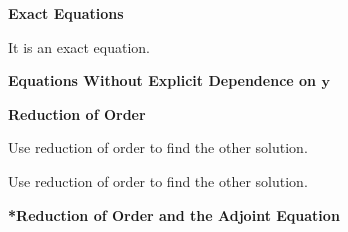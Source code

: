 {%
\begin{Hint}
  \label{hint x2y-2xy+2y=0}
\end{Hint}







\begin{large}
  \noindent
  \textbf{Exact Equations}
\end{large}



\begin{Hint}
  \label{hint y+ysinx+ycosx}
  It is an exact equation.
\end{Hint}



\begin{large}
  \noindent
  \textbf{Equations Without Explicit Dependence on $\mathbf{y}$}
\end{large}

\begin{large}
  \noindent
  \textbf{Reduction of Order}
\end{large}




\begin{Hint}
  \label{hint 1-x2y-2xy+2y}
\end{Hint}


\begin{Hint}
  \label{hint y-x+1xy+1xy}
  Use reduction of order to find the other solution.
\end{Hint}


\begin{Hint}
  \label{hint 1-2xy+4xy-4y}
  Use reduction of order to find the other solution.
\end{Hint}




\begin{Hint}
  \label{hint (x-1)y-xy+y=0}
\end{Hint}




\begin{large}
  \noindent
  \textbf{*Reduction of Order and the Adjoint Equation}
\end{large}
















}
